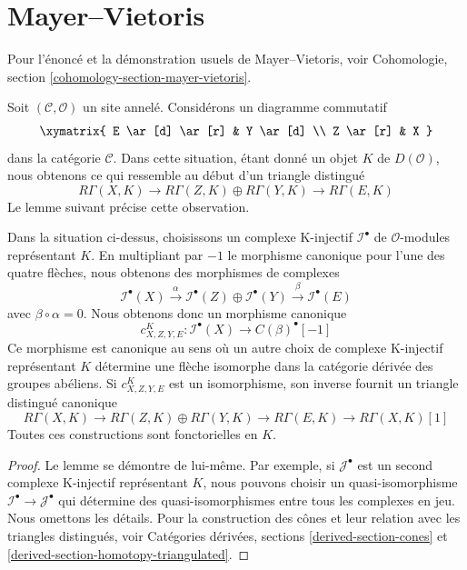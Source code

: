 \section{Mayer--Vietoris}
\label{section-mayer-vietoris}

\noindent
Pour l'énoncé et la démonstration usuels de Mayer--Vietoris, voir
Cohomologie, section \ref{cohomology-section-mayer-vietoris}.

\medskip\noindent
Soit $(\mathcal{C}, \mathcal{O})$ un site annelé. Considérons un diagramme
commutatif
$$
\xymatrix{
E \ar[d] \ar[r] & Y \ar[d] \\
Z \ar[r] & X
}
$$
dans la catégorie $\mathcal{C}$. Dans cette situation, étant donné un objet
$K$ de $D(\mathcal{O})$, nous obtenons ce qui ressemble au début d'un
triangle distingué
$$
R\Gamma(X, K) \to
R\Gamma(Z, K) \oplus
R\Gamma(Y, K) \to
R\Gamma(E, K)
$$
Le lemme suivant précise cette observation.

\begin{lemma}
\label{lemma-c-square}
Dans la situation ci-dessus, choisissons un complexe K-injectif
$\mathcal{I}^\bullet$ de $\mathcal{O}$-modules représentant $K$. En
multipliant par $-1$ le morphisme canonique pour l'une des quatre flèches,
nous obtenons des morphismes de complexes
$$
\mathcal{I}^\bullet(X) \xrightarrow{\alpha}
\mathcal{I}^\bullet(Z) \oplus
\mathcal{I}^\bullet(Y) \xrightarrow{\beta}
\mathcal{I}^\bullet(E)
$$
avec $\beta \circ \alpha = 0$. Nous obtenons donc un morphisme canonique
$$
c^K_{X, Z, Y, E} :
\mathcal{I}^\bullet(X)
\longrightarrow
C(\beta)^\bullet[-1]
$$
Ce morphisme est canonique au sens où un autre choix de complexe
K-injectif représentant $K$ détermine une flèche isomorphe dans la
catégorie dérivée des groupes abéliens. Si $c^K_{X, Z, Y, E}$ est un
isomorphisme, son inverse fournit un triangle distingué canonique
$$
R\Gamma(X, K) \to
R\Gamma(Z, K) \oplus
R\Gamma(Y, K) \to
R\Gamma(E, K) \to
R\Gamma(X, K)[1]
$$
Toutes ces constructions sont fonctorielles en $K$.
\end{lemma}

\begin{proof}
Le lemme se démontre de lui-même. Par exemple, si
$\mathcal{J}^\bullet$ est un second complexe K-injectif représentant $K$,
nous pouvons choisir un quasi-isomorphisme
$\mathcal{I}^\bullet \to \mathcal{J}^\bullet$ qui détermine des
quasi-isomorphismes entre tous les complexes en jeu. Nous omettons les
détails. Pour la construction des cônes et leur relation avec les triangles
distingués, voir Catégories dérivées, sections
\ref{derived-section-cones} et
\ref{derived-section-homotopy-triangulated}.
\end{proof}


